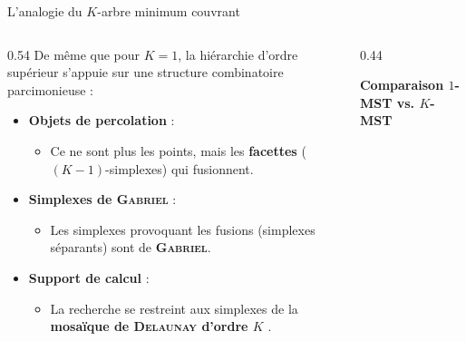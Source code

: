 \documentclass[A4,svgnames,9pt,aspectratio=169]{beamer}
\begin{document}
\begin{frame}{L'analogie du $K$-arbre minimum couvrant}
    \begin{columns}[c, onlytextwidth]
        \begin{column}{0.54\textwidth}
            De même que pour $K=1$, la hiérarchie d'ordre supérieur s'appuie sur une structure combinatoire parcimonieuse :
            
            \vspace{0.3cm}
            \begin{itemize}
                \setlength{\itemsep}{10pt}
                \item \textbf{Objets de percolation} :
                \begin{itemize}
                    \item Ce ne sont plus les points, mais les \textbf{facettes} ($(K-1)$-simplexes) qui fusionnent.
                \end{itemize}
                \item \textbf{Simplexes de \textsc{Gabriel}} :
                \begin{itemize}
                    \item Les simplexes provoquant les fusions (simplexes séparants) sont de \textbf{\textsc{Gabriel}}.
                \end{itemize}
                \item \textbf{Support de calcul} :
                \begin{itemize}
                    \item La recherche se restreint aux simplexes de la \textbf{mosaïque de \textsc{Delaunay} d'ordre $K$} \cite{osangEdelsbrunner2023algorithm}.
                \end{itemize}
            \end{itemize}
        \end{column}
        
        \begin{column}{0.44\textwidth}
            \begin{center}
                \textbf{Comparaison $1$-MST vs. $K$-MST}
                

\end{center}
\end{column}
\end{columns}
\end{frame}
\end{document}
